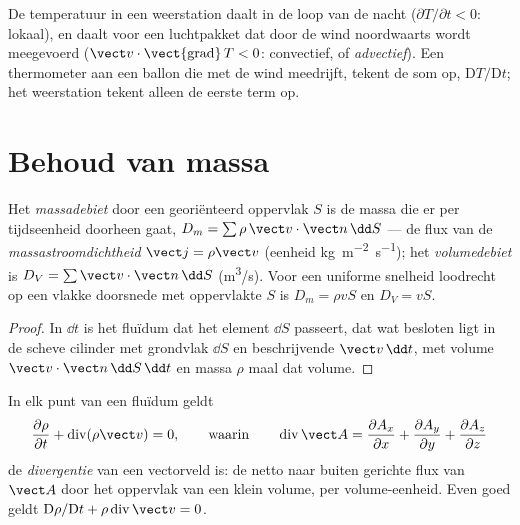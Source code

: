 \begin{example}\label{ex:b2:fluid-kinematics:weather}
De temperatuur in een weerstation daalt in de loop van de nacht
($\partial T/
\partial t < 0$: lokaal), en daalt voor een luchtpakket dat
door de wind noordwaarts wordt meegevoerd
($\vect v\cdot\operatorname{\vect{grad}}T < 0$: convectief, of
\emph{advectief}). Een thermometer aan een ballon die met de wind meedrijft,
tekent de som op, $\mathrm DT/\mathrm Dt$; het weerstation tekent alleen de
eerste term op.
\end{example}

\section{Behoud van massa}

\begin{definition}\label{def:b2:fluid-kinematics:flowrate}
Het \emph{massadebiet} door een georiënteerd oppervlak $S$ is de massa die
er per tijdseenheid doorheen gaat,
$D_m = \sum\rho\,\vect v\cdot\vect n\,\dd S$ --- de flux van de
\emph{massastroomdichtheid} $\vect j = \rho\vect v$ (eenheid
\unit{kg.m^{-2}.s^{-1}}); het \emph{volumedebiet} is
$D_V = \sum\vect v
\cdot\vect n\,\dd S$ (\unit{m^3/s}). Voor een uniforme
snelheid loodrecht op een vlakke doorsnede met oppervlakte $S$ is
$D_m = \rho vS$ en $D_V = vS$.
\end{definition}

\begin{proof}
In $\dd t$ is het fluïdum dat het element $\dd S$ passeert, dat wat besloten
ligt in de scheve cilinder met grondvlak $\dd S$ en beschrijvende
$\vect v\,\dd t$, met volume $\vect v\cdot\vect n\,\dd S\,\dd t$ en massa
$\rho$ maal dat volume.
\end{proof}

\begin{theorem}\label{thm:b2:fluid-kinematics:continuity}
In elk punt van een fluïdum geldt
\[
\frac{\partial\rho}{\partial t} + \operatorname{div}(\rho\vect v) = 0 ,
\qquad\text{waarin}\qquad
\operatorname{div}\vect A = \frac{\partial A_x}{\partial x} + \frac{\partial A_y}{\partial y} +
\frac{\partial A_z}{\partial z}
\]
de \emph{divergentie} van een vectorveld is: de netto naar buiten gerichte
flux van $\vect A$ door het oppervlak van een klein volume, per
volume-eenheid. Even goed geldt
$\mathrm D\rho/\mathrm Dt + \rho\operatorname{div}\vect v = 0$.
\end{theorem}


